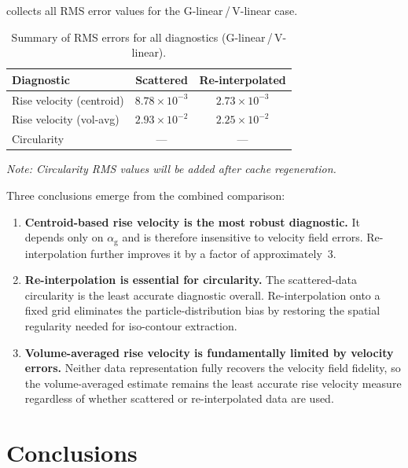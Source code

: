 \documentclass[11pt,a4paper]{article}
\newcommand{\alphag}{\alpha_{\mathrm{g}}}
\begin{document}
 collects all RMS error values for the
G-linear\,/\,V-linear case.

\begin{table}[ht]
\centering
\caption{Summary of RMS errors for all diagnostics
  (G-linear\,/\,V-linear).}
\label{tab:summary}
\begin{tabular}{l cc}
  \toprule
  \textbf{Diagnostic} & \textbf{Scattered} & \textbf{Re-interpolated} \\
  \midrule
  Rise velocity (centroid)   & $8.78 \times 10^{-3}$ & $2.73 \times 10^{-3}$ \\
  Rise velocity (vol-avg)    & $2.93 \times 10^{-2}$ & $2.25 \times 10^{-2}$ \\
  Circularity                & ---                    & ---                    \\
  \bottomrule
\end{tabular}
\end{table}

\noindent
\textit{Note: Circularity RMS values will be added after cache
regeneration.}

Three conclusions emerge from the combined comparison:

\begin{enumerate}[label=(\roman*)]
  \item \textbf{Centroid-based rise velocity is the most robust diagnostic.}
    It depends only on $\alphag$ and is therefore insensitive to velocity
    field errors.  Re-interpolation further improves it by a factor of
    approximately~3.

  \item \textbf{Re-interpolation is essential for circularity.}
    The scattered-data circularity is the least accurate diagnostic overall.
    Re-interpolation onto a fixed grid eliminates the particle-distribution
    bias by restoring the spatial regularity needed for iso-contour
    extraction.

  \item \textbf{Volume-averaged rise velocity is fundamentally limited by
    velocity errors.}
    Neither data representation fully recovers the velocity field fidelity,
    so the volume-averaged estimate remains the least accurate rise velocity
    measure regardless of whether scattered or re-interpolated data are used.
\end{enumerate}


\section{Conclusions}\label{sec:conclusions}
\end{document}
